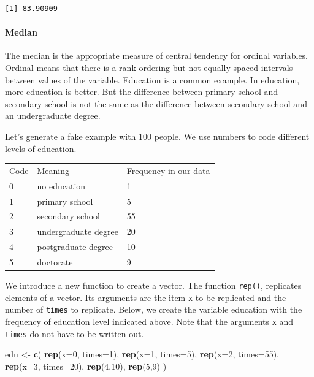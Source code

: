 \documentclass[]{article}
\newenvironment{Shaded}{\begin{snugshade}}{\end{snugshade}}
\newcommand{\DataTypeTok}[1]{\textcolor[rgb]{0.13,0.29,0.53}{#1}}
\newcommand{\DecValTok}[1]{\textcolor[rgb]{0.00,0.00,0.81}{#1}}
\newcommand{\KeywordTok}[1]{\textcolor[rgb]{0.13,0.29,0.53}{\textbf{#1}}}
\newcommand{\NormalTok}[1]{#1}
\newcommand{\StringTok}[1]{\textcolor[rgb]{0.31,0.60,0.02}{#1}}
\let\oldparagraph\paragraph
\renewcommand{\paragraph}[1]{\oldparagraph{#1}\mbox{}}
\begin{document}
\begin{verbatim}
[1] 83.90909
\end{verbatim}

\hypertarget{median}{%
\paragraph{Median}\label{median}}

The median is the appropriate measure of central tendency for ordinal variables. Ordinal means that there is a rank ordering but not equally spaced intervals between values of the variable. Education is a common example. In education, more education is better. But the difference between primary school and secondary school is not the same as the difference between secondary school and an undergraduate degree.

Let's generate a fake example with 100 people. We use numbers to code different levels of education.

\begin{longtable}[]{@{}lll@{}}
\toprule
\endhead
Code & Meaning & Frequency in our data\tabularnewline
0 & no education & 1\tabularnewline
1 & primary school & 5\tabularnewline
2 & secondary school & 55\tabularnewline
3 & undergraduate degree & 20\tabularnewline
4 & postgraduate degree & 10\tabularnewline
5 & doctorate & 9\tabularnewline
\bottomrule
\end{longtable}

We introduce a new function to create a vector. The function \texttt{rep()}, replicates elements of a vector. Its arguments are the item \texttt{x} to be replicated and the number of \texttt{times} to replicate. Below, we create the variable education with the frequency of education level indicated above. Note that the arguments \texttt{x} and \texttt{times} do not have to be written out.

\begin{Shaded}
\begin{Highlighting}[]
\NormalTok{edu <-}\StringTok{ }\KeywordTok{c}\NormalTok{( }\KeywordTok{rep}\NormalTok{(}\DataTypeTok{x=}\DecValTok{0}\NormalTok{, }\DataTypeTok{times=}\DecValTok{1}\NormalTok{), }\KeywordTok{rep}\NormalTok{(}\DataTypeTok{x=}\DecValTok{1}\NormalTok{, }\DataTypeTok{times=}\DecValTok{5}\NormalTok{), }\KeywordTok{rep}\NormalTok{(}\DataTypeTok{x=}\DecValTok{2}\NormalTok{, }\DataTypeTok{times=}\DecValTok{55}\NormalTok{),}
          \KeywordTok{rep}\NormalTok{(}\DataTypeTok{x=}\DecValTok{3}\NormalTok{, }\DataTypeTok{times=}\DecValTok{20}\NormalTok{), }\KeywordTok{rep}\NormalTok{(}\DecValTok{4}\NormalTok{,}\DecValTok{10}\NormalTok{), }\KeywordTok{rep}\NormalTok{(}\DecValTok{5}\NormalTok{,}\DecValTok{9}\NormalTok{) )}
\end{Highlighting}
\end{Shaded}
\end{document}
